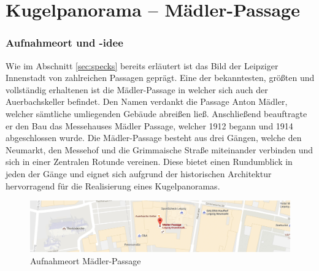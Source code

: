 \documentclass[liststotoc,bibtotoc,fontsize=14pt,]{scrreprt}
\begin{document}
	\section{Kugelpanorama --  Mädler-Passage}
	\label{sec:kugel}
			\subsubsection{Aufnahmeort und -idee}
			Wie im Abschnitt \ref{sec:specks} bereits erläutert ist das Bild der Leipziger Innenstadt von zahlreichen Passagen geprägt. Eine der bekanntesten, größten und vollständig erhaltenen ist die Mädler-Passage in welcher sich auch der Auerbachskeller befindet. Den Namen verdankt die Passage Anton Mädler, welcher sämtliche umliegenden Gebäude abreißen ließ. Anschließend beauftragte er den Bau das Messehauses Mädler Passage, welcher 1912 begann und 1914 abgeschlossen wurde. Die Mädler-Passage besteht aus drei Gängen, welche den Neumarkt, den Messehof und die Grimmaische Straße miteinander verbinden und sich in einer Zentralen Rotunde vereinen. Diese bietet einen Rundumblick in jeden der Gänge und eignet sich aufgrund der historischen Architektur hervorragend für die Realisierung eines Kugelpanoramas.
			\begin{figure}[H]
				\includegraphics[width=\linewidth]{img/places/mae_map.jpg}
				\caption{Aufnahmeort Mädler-Passage}
				\label{img:mae_map}
			\end{figure}
			
\end{document}
